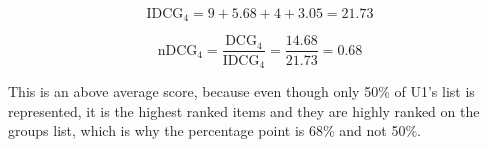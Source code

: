 \begin{equation}\label{eq:background_idcg_example}
\text{IDCG}_4 = 9 + 5.68 + 4 + 3.05 = 21.73
\end{equation}

\begin{equation}\label{eq:background_ndcg_example}
\text{nDCG}_4 = \frac{\text{DCG}_4}{\text{IDCG}_4} = \frac{14.68}{21.73}=0.68
\end{equation}

This is an above average score, because even though only 50\% of U1's list is represented, it is the highest ranked items and they are highly ranked on the groups list, which is why the percentage point is 68\% and not 50\%. 
